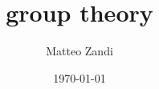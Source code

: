 \documentclass[a4paper, 12pt, openany]{memoir}
\title{group theory}
\author{Matteo Zandi}
\date{\today}
\begin{document}
\frontmatter



\tableofcontents

\mainmatter





\backmatter

\listoftheorems

\clearpage
{}
\printbibliography
\end{document}
